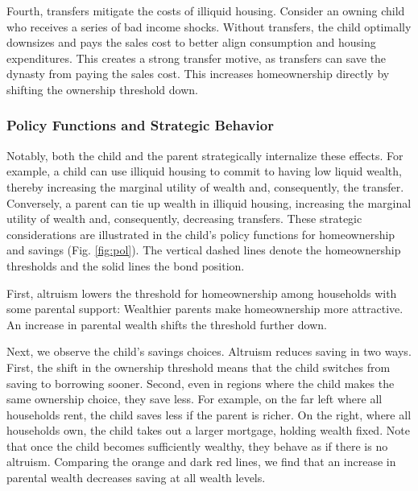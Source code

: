 \documentclass[12pt]{article}
\begin{document}
Fourth, transfers mitigate the costs of illiquid housing. Consider an owning child who receives a series of bad income shocks. Without transfers, the child optimally downsizes and pays the sales cost to better align consumption and housing expenditures. This creates a strong transfer motive, as transfers can save the dynasty from paying the sales cost. This increases homeownership directly by shifting the ownership threshold down.

\subsubsection{Policy Functions and Strategic Behavior}\label{sec:policyfuncs}
Notably, both the child and the parent strategically internalize these effects. For example, a child can use illiquid housing to commit to having low liquid wealth, thereby increasing the marginal utility of wealth and, consequently, the transfer. Conversely, a parent can tie up wealth in illiquid housing, increasing the marginal utility of wealth and, consequently, decreasing transfers. These strategic considerations are illustrated in the child's policy functions for homeownership and savings (Fig. \ref{fig:pol}). The vertical dashed lines denote the homeownership thresholds and the solid lines the bond position.

First, altruism lowers the threshold for homeownership among households with some parental support: Wealthier parents make homeownership more attractive. An increase in parental wealth shifts the threshold further down.

Next, we observe the child's savings choices. Altruism reduces saving in two ways. First, the shift in the ownership threshold means that the child switches from saving to borrowing sooner. Second, even in regions where the child makes the same ownership choice, they save less. For example, on the far left where all households rent, the child saves less if the parent is richer. On the right, where all households own, the child takes out a larger mortgage, holding wealth fixed. Note that once the child becomes sufficiently wealthy, they behave as if there is no altruism. Comparing the orange and dark red lines, we find that an increase in parental wealth decreases saving at all wealth levels.
\end{document}
